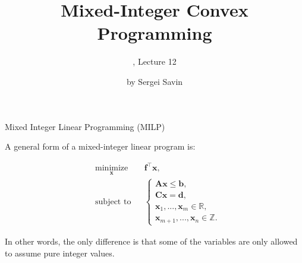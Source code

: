 \documentclass{beamer}
\title{Mixed-Integer Convex Programming}
\subtitle{\mycoursetitle, Lecture 12}
\author{by Sergei Savin}
\date{\mydate}
\begin{document}
\maketitle


%
%



\begin{frame}{Mixed Integer Linear Programming (MILP)}
\begin{flushleft}

A general form of a mixed-integer linear program is:

%
\begin{equation} \label{LP}
\begin{aligned}
& \underset{\mathbf{x}}{\text{minimize}}
& & \mathbf{f}^\top \mathbf{x}, \\
& \text{subject to}
& & \begin{cases} 
\mathbf{A} \mathbf{x}
\leq 
\mathbf{b}, \\ 
\mathbf{C}\mathbf{x} = 
\mathbf{d},  \\
\mathbf{x}_1, ..., \mathbf{x}_m \in \mathbb{R},\\
\mathbf{x}_{m+1}, ..., \mathbf{x}_n \in \mathbb{Z}.
\end{cases}
%
\end{aligned}
\end{equation}
 
In other words, the only difference is that some of the variables are only allowed to assume pure integer values.
 
\end{flushleft}
\end{frame}
\end{document}
